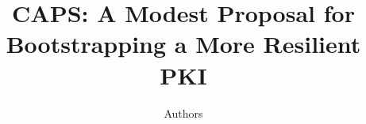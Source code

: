 \documentclass[conference]{IEEEtran}
\begin{document}
\title{
  CAPS: A Modest Proposal for\\Bootstrapping a More Resilient PKI
}
\author{
  Authors
}


\maketitle


\begin{abstract}
  
\end{abstract}











%









\end{document}
